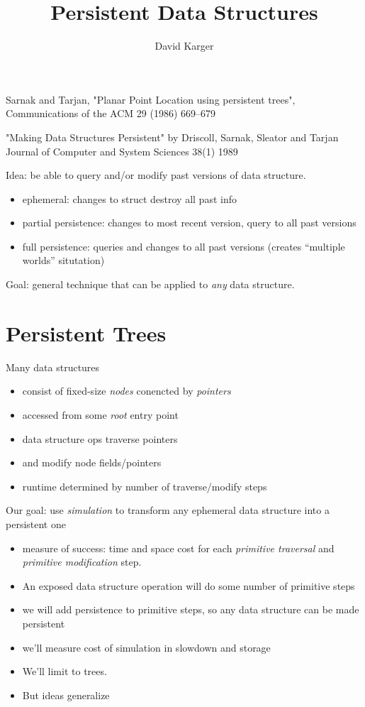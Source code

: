 \documentclass{article}
\title{Persistent Data Structures}
\author{David Karger}
\begin{document}

Sarnak and Tarjan, "Planar Point Location using persistent trees",
Communications of the ACM 29 (1986) 669--679

"Making Data Structures Persistent" by Driscoll, Sarnak, Sleator and Tarjan 
Journal of Computer and System Sciences 38(1) 1989

Idea: be able to query and/or modify past versions of data structure.
\begin{itemize}
\item ephemeral: changes to struct destroy all past info
\item partial persistence: changes to most recent version, query to
  all past versions
\item full persistence: queries and changes to all past versions
  (creates ``multiple worlds'' situtation)
\end{itemize}

Goal: general technique that can be applied to \emph{any} data
structure.



\section{Persistent Trees}

Many data structures
\begin{itemize}
\item consist of fixed-size \emph{nodes}
  conencted by \emph{pointers}
\item accessed from some \emph{root} entry point
\item data structure ops traverse pointers
\item and modify node fields/pointers
\item runtime determined by number of traverse/modify steps
\end{itemize}

Our goal: use \emph{simulation} to transform any ephemeral data
structure into a persistent one
\begin{itemize}
\item measure of success: time and space cost for each \emph{primitive
    traversal} and \emph{primitive modification} step.
\item An exposed data structure operation will do some number of
  primitive steps
\item we will add persistence to primitive steps, so any data
  structure can be made persistent
\item we'll measure cost of simulation in slowdown and storage
\item We'll limit to trees.
\item But ideas generalize
\end{itemize}
\end{document}
